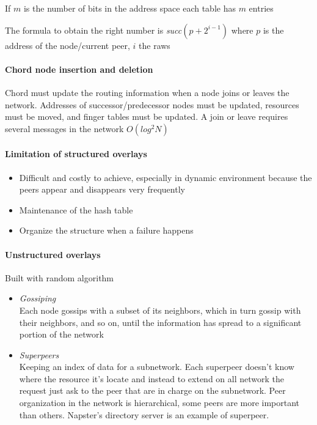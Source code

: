 If $m$ is the number of bits in the address space each table has $m$ entries

The formula to obtain the right number is \textit{succ}$(p + 2^{i-1})$ where $p$ is the address of the node/current peer, $i$ the raws

\paragraph{Chord node insertion and deletion}
Chord must update the routing information when a node joins
or leaves the network. Addresses of successor/predecessor nodes must be updated, resources must be moved, and finger tables must be updated. A join or leave requires several messages in the network $O(log^2 N)$

\paragraph{Limitation of structured overlays}
\begin{itemize}
    \item Difficult and costly to achieve, especially in dynamic environment because the peers appear and disappears very frequently
    \item Maintenance of the hash table
    \item  Organize the structure when a failure happens
\end{itemize}

\paragraph{Unstructured overlays}
Built with random algorithm

\begin{itemize}
    \item \textit{Gossiping}\\
    Each node gossips with a subset of its neighbors, which in turn gossip with their neighbors, and so on, until the information has spread to a significant portion of the network
    \item \textit{Superpeers}\\
    Keeping an index of data for a subnetwork. Each superpeer doesn’t know where the resource it’s locate and instead to extend on all network the request just ask to the peer that are in charge on the subnetwork. Peer organization in the network is hierarchical, some peers are more important than others. Napster’s directory server is an example of superpeer.
\end{itemize}

\newpage